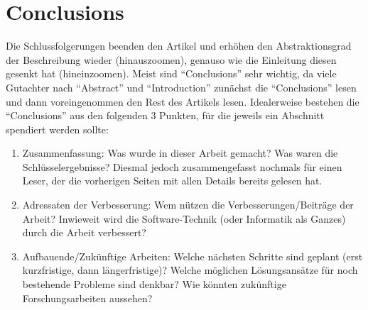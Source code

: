\documentclass[runningheads,a4paper]{uwsese}
\begin{document}
\section{Conclusions}
\label{seq:conclusion}
Die Schlussfolgerungen beenden den Artikel und erhöhen den Abstraktionsgrad der Beschreibung wieder (hinauszoomen), genauso wie die Einleitung diesen gesenkt hat (hineinzoomen). Meist sind ``Conclusions'' sehr wichtig, da viele Gutachter nach ``Abstract'' und ``Introduction'' zunächst die ``Conclusions'' lesen und dann voreingenommen den Rest des Artikels lesen. Idealerweise bestehen die ``Conclusions'' aus den folgenden 3 Punkten, für die jeweils ein Abschnitt spendiert werden sollte:
\begin{enumerate}
	\item Zusammenfassung: Was wurde in dieser Arbeit gemacht? Was waren die Schlüsselergebnisse? Diesmal jedoch zusammengefasst nochmals für einen Leser, der die vorherigen Seiten mit allen Details bereits gelesen hat.
	\item Adressaten der Verbesserung: Wem nützen die Verbesserungen/Beiträge der Arbeit? Inwieweit wird die Software-Technik (oder Informatik als Ganzes) durch die Arbeit verbessert?
	\item Aufbauende/Zukünftige Arbeiten: Welche nächsten Schritte sind geplant (erst kurzfristige, dann längerfristige)? Welche möglichen Lösungsansätze für noch bestehende Probleme sind denkbar? Wie könnten zukünftige Forschungsarbeiten aussehen?
\end{enumerate}



\end{document}
